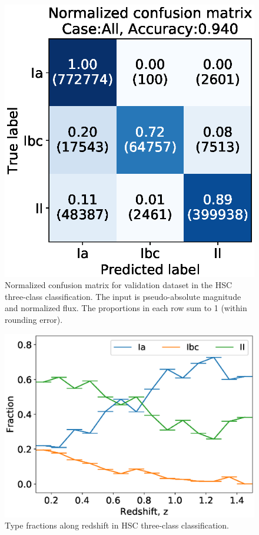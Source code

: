 \documentclass[proof]{pasj01}
\begin{document}
%
%
\begin{figure}[htbp]
  \begin{center}
     \includegraphics[width=\columnwidth]{figures/13_CM_abs-mag_scaled-flux_w-mixup_remove-y_predictions_validation_2_Flagall_weighted.eps}
  \end{center}
  \caption{%
  Normalized confusion matrix for validation dataset in the HSC three-class classification.
  The input is pseudo-absolute magnitude and normalized flux.
  The proportions in each row sum to 1 (within rounding error).
  }%
  \label{fig:h3_validation_CM}
\end{figure}
%
%
%
\begin{figure}[htbp]
  \begin{center}
     \includegraphics[width=\columnwidth]{figures/SNfrac_alongz.eps}
  \end{center}
  \caption{%
  Type fractions along redshift in HSC three-class classification.
  }%
  \label{fig:hsc3_type_frac_alongz}
\end{figure}
%
\end{document}
